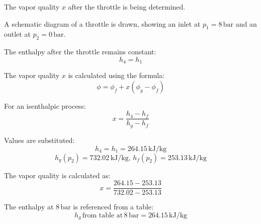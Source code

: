 The vapor quality \( x \) after the throttle is being determined.  

A schematic diagram of a throttle is drawn, showing an inlet at \( p_1 = 8 \, \text{bar} \) and an outlet at \( p_2 = 0 \, \text{bar} \).  

The enthalpy after the throttle remains constant:  
\[
h_4 = h_1
\]  

The vapor quality \( x \) is calculated using the formula:  
\[
\phi = \phi_f + x (\phi_g - \phi_f)
\]  

For an isenthalpic process:  
\[
x = \frac{h_4 - h_f}{h_g - h_f}
\]  

Values are substituted:  
\[
h_4 = h_1 = 264.15 \, \text{kJ/kg}
\]  
\[
h_g(p_2) = 732.02 \, \text{kJ/kg}, \, h_f(p_2) = 253.13 \, \text{kJ/kg}
\]  

The vapor quality is calculated as:  
\[
x = \frac{264.15 - 253.13}{732.02 - 253.13}
\]  

The enthalpy at \( 8 \, \text{bar} \) is referenced from a table:  
\[
h_g \, \text{from table at} \, 8 \, \text{bar} = 264.15 \, \text{kJ/kg}
\]